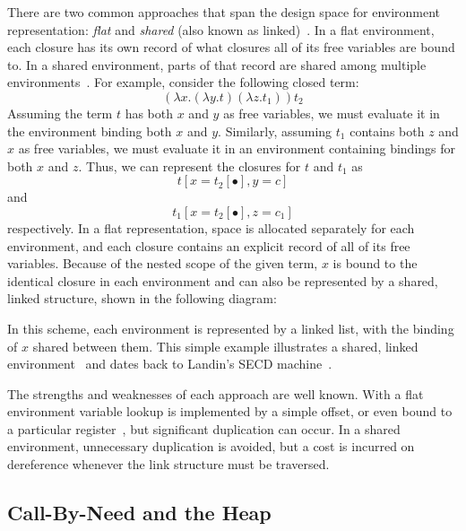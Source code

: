 \documentclass[preprint]{sigplanconf}
\begin{document}
There are two common approaches that span the design space for environment
representation: \emph{flat} and \emph{shared} (also
known as linked)~\cite{appel1988optimizing, shao1994space}. In a flat
environment, each closure has its own record of what closures all
of its free variables are bound to. In a shared environment, parts
of that record are shared among multiple environments~\cite{appel1988optimizing,
shao1994space}. For example, consider the following closed term: $$(\lambda
x.(\lambda y.t) (\lambda z.t_1)) t_2$$ Assuming the term $t$ has both $x$ and
$y$ as free variables, we must evaluate it in the environment binding both $x$
and $y$.  Similarly, assuming $t_1$ contains both $z$ and $x$ as free variables,
we must evaluate it in an environment containing bindings for both $x$ and $z$.
Thus, we can represent the closures for $t$ and $t_1$ as $$t[x=t_2[\bullet],
y=c]$$ and $$t_1[x=t_2[\bullet], z=c_1]$$ respectively. In a flat
representation, space is allocated separately for each environment, and each
closure contains an explicit record of all of its free variables. Because of the
nested scope of the given term, $x$ is bound to the identical closure in each
environment and can also be represented by a shared, linked structure, shown in
the following diagram:

\begin{center}
\end{center}
In this scheme, each environment is represented by a linked list, with
the binding of $x$ shared between them. This simple example
illustrates a shared, linked environment~\cite{appel1988optimizing}
and dates back to Landin's SECD machine~\cite{landin1964mechanical}.

The strengths and weaknesses of each approach are well known.  With a flat
environment variable lookup is implemented by a simple offset, or even
bound to a particular register~\cite{jonesstg, appel2006compiling},
but significant duplication can occur.  In a shared environment, unnecessary
duplication is avoided, but a cost is incurred on dereference whenever the
link structure must be traversed.

\subsection{Call-By-Need and the Heap}
\end{document}

